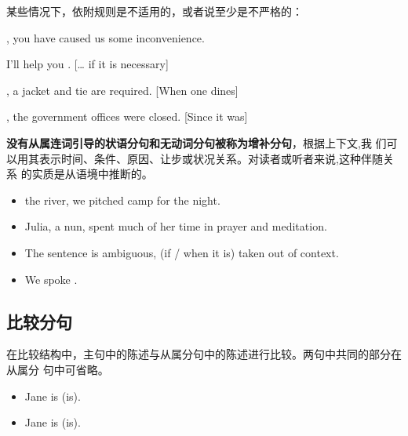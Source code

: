 某些情况下，依附规则是不适用的，或者说至少是不严格的：
\begin{description}[style=nextline]
\item[分句是一个主语外接状语, 这时隐含的主语是说话者 I]

  , you have caused us some inconvenience.

\item[隐含的主语是整个主句]

  I'll help you . [\ldots{} if it is necessary]

\item[隐含的主语是一个不定代词或支撑词 it]

  , a jacket and tie are required. [When one
  dines]

  , the government offices were closed. [Since it was]
\end{description}


\textbf{没有从属连词引导的状语分句和无动词分句被称为增补分句}，根据上下文,我
们可以用其表示时间、条件、原因、让步或状况关系。对读者或听者来说,这种伴随关系
的实质是从语境中推断的。

\begin{itemize}
\item {} the river, we pitched camp for the night.
\item Julia,  a nun, spent much of her time in
  prayer and meditation.
\item The sentence is ambiguous, (if / when it is) taken out of context.

\item We spoke .
\end{itemize}

\subsection{比较分句}

在比较结构中，主句中的陈述与从属分句中的陈述进行比较。两句中共同的部分在从属分
句中可省略。
\begin{itemize}
\item Jane is     (is).
\item Jane is    (is).
\end{itemize}

